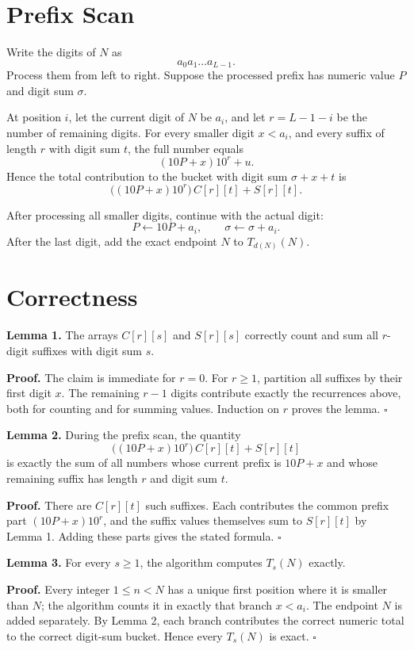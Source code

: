 \documentclass[11pt]{article}
\begin{document}
\section{Prefix Scan}

Write the digits of $N$ as
\[
a_0a_1\dots a_{L-1}.
\]
Process them from left to right. Suppose the processed prefix has numeric value $P$ and digit sum $\sigma$.

At position $i$, let the current digit of $N$ be $a_i$, and let $r=L-1-i$ be the number of remaining digits.
For every smaller digit $x<a_i$, and every suffix of length $r$ with digit sum $t$, the full number equals
\[
(10P+x)10^r + u.
\]
Hence the total contribution to the bucket with digit sum $\sigma+x+t$ is
\[
\bigl((10P+x)10^r\bigr)\,C[r][t] + S[r][t].
\]

After processing all smaller digits, continue with the actual digit:
\[
P \leftarrow 10P+a_i,\qquad \sigma \leftarrow \sigma + a_i.
\]
After the last digit, add the exact endpoint $N$ to $T_{d(N)}(N)$.

\section{Correctness}

\textbf{Lemma 1.} The arrays $C[r][s]$ and $S[r][s]$ correctly count and sum all $r$-digit suffixes with digit sum $s$.

\textbf{Proof.} The claim is immediate for $r=0$. For $r\ge 1$, partition all suffixes by their first digit $x$. The remaining $r-1$ digits contribute exactly the recurrences above, both for counting and for summing values. Induction on $r$ proves the lemma. $\square$

\textbf{Lemma 2.} During the prefix scan, the quantity
\[
\bigl((10P+x)10^r\bigr)\,C[r][t] + S[r][t]
\]
is exactly the sum of all numbers whose current prefix is $10P+x$ and whose remaining suffix has length $r$ and digit sum $t$.

\textbf{Proof.} There are $C[r][t]$ such suffixes. Each contributes the common prefix part $(10P+x)10^r$, and the suffix values themselves sum to $S[r][t]$ by Lemma 1. Adding these parts gives the stated formula. $\square$

\textbf{Lemma 3.} For every $s\ge 1$, the algorithm computes $T_s(N)$ exactly.

\textbf{Proof.} Every integer $1\le n<N$ has a unique first position where it is smaller than $N$; the algorithm counts it in exactly that branch $x<a_i$. The endpoint $N$ is added separately. By Lemma 2, each branch contributes the correct numeric total to the correct digit-sum bucket. Hence every $T_s(N)$ is exact. $\square$
\end{document}
